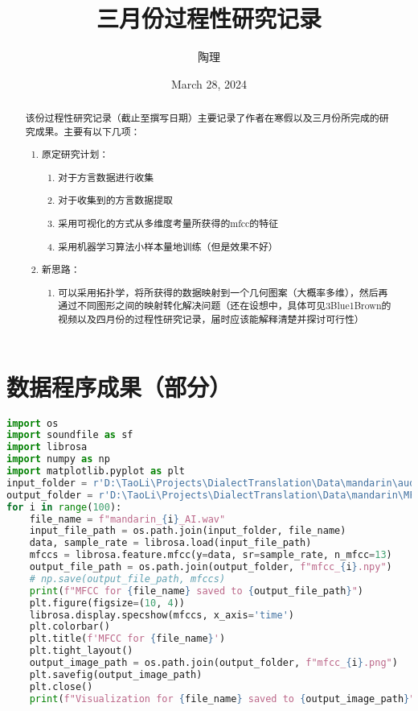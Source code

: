 \documentclass[lang=cn]{elegantpaper}
\title{三月份过程性研究记录}
\author{陶理}
\begin{document}
\date{March 28, 2024}
\maketitle
\begin{abstract}
该份过程性研究记录（截止至撰写日期）主要记录了作者在寒假以及三月份所完成的研究成果。主要有以下几项：
\begin{enumerate}
    \item 原定研究计划：
    \begin{enumerate}
        \item 对于方言数据进行收集
        \item 对于收集到的方言数据提取
        \item 采用可视化的方式从多维度考量所获得的mfcc的特征
        \item 采用机器学习算法小样本量地训练（但是效果不好）
    \end{enumerate}
    \item 新思路：
    \begin{enumerate}
        \item 可以采用拓扑学，将所获得的数据映射到一个几何图案（大概率多维），然后再通过不同图形之间的映射转化解决问题（还在设想中，具体可见3Blue1Brown的视频以及四月份的过程性研究记录，届时应该能解释清楚并探讨可行性）
    \end{enumerate}
\end{enumerate}
\end{abstract}
\section{数据程序成果（部分）}
\begin{lstlisting}[language=Python]
import os
import soundfile as sf
import librosa
import numpy as np
import matplotlib.pyplot as plt
input_folder = r'D:\TaoLi\Projects\DialectTranslation\Data\mandarin\audio\GeneratedByAI'
output_folder = r'D:\TaoLi\Projects\DialectTranslation\Data\mandarin\MFCC'
for i in range(100):
    file_name = f"mandarin_{i}_AI.wav"
    input_file_path = os.path.join(input_folder, file_name)         
    data, sample_rate = librosa.load(input_file_path)
    mfccs = librosa.feature.mfcc(y=data, sr=sample_rate, n_mfcc=13)
    output_file_path = os.path.join(output_folder, f"mfcc_{i}.npy")
    # np.save(output_file_path, mfccs)
    print(f"MFCC for {file_name} saved to {output_file_path}")
    plt.figure(figsize=(10, 4))
    librosa.display.specshow(mfccs, x_axis='time')
    plt.colorbar()
    plt.title(f'MFCC for {file_name}')
    plt.tight_layout()
    output_image_path = os.path.join(output_folder, f"mfcc_{i}.png")
    plt.savefig(output_image_path)
    plt.close()
    print(f"Visualization for {file_name} saved to {output_image_path}")
\end{lstlisting}
\end{document}

